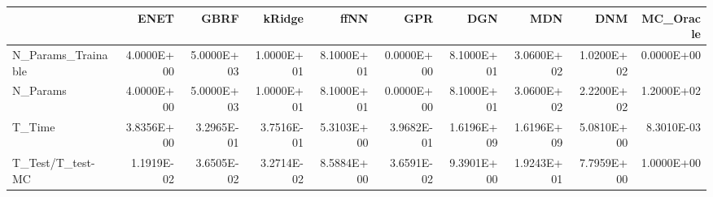 \begin{tabular}{lrrrrrrrrr}
\toprule
{} &       ENET &       GBRF &     kRidge &       ffNN &        GPR &        DGN &        MDN &        DNM &  MC\_Oracle \\
\midrule
N\_Params\_Trainable & 4.0000E+00 & 5.0000E+03 & 1.0000E+01 & 8.1000E+01 & 0.0000E+00 & 8.1000E+01 & 3.0600E+02 & 1.0200E+02 & 0.0000E+00 \\
N\_Params           & 4.0000E+00 & 5.0000E+03 & 1.0000E+01 & 8.1000E+01 & 0.0000E+00 & 8.1000E+01 & 3.0600E+02 & 2.2200E+02 & 1.2000E+02 \\
T\_Time             & 3.8356E+00 & 3.2965E-01 & 3.7516E-01 & 5.3103E+00 & 3.9682E-01 & 1.6196E+09 & 1.6196E+09 & 5.0810E+00 & 8.3010E-03 \\
T\_Test/T\_test-MC   & 1.1919E-02 & 3.6505E-02 & 3.2714E-02 & 8.5884E+00 & 3.6591E-02 & 9.3901E+00 & 1.9243E+01 & 7.7959E+00 & 1.0000E+00 \\
\bottomrule
\end{tabular}
